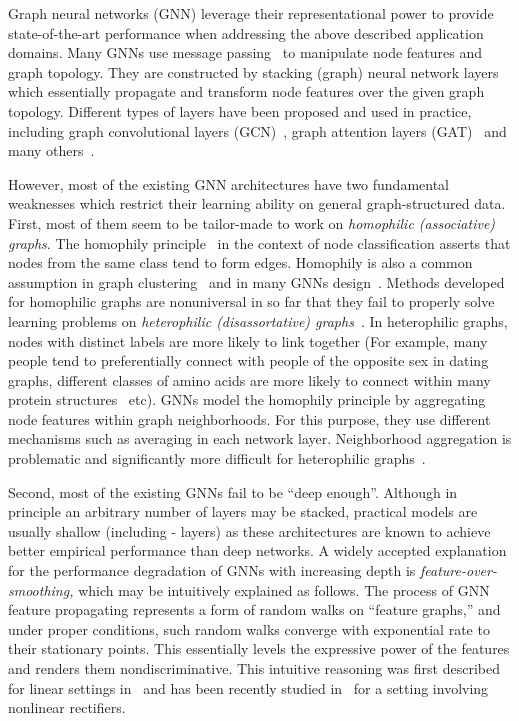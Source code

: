 \documentclass{article} \usepackage{iclr2021_conference,times}
\begin{document}
Graph neural networks (GNN) leverage their representational power to provide state-of-the-art performance when addressing the above described application domains. Many GNNs use message passing~\citep{gilmer2017neural,battaglia2018relational} to manipulate node features and graph topology. They are constructed by stacking (graph) neural network layers which essentially propagate and transform node features over the given graph topology. Different types of layers have been proposed and used in practice, including graph convolutional layers (GCN)~\citep{bruna2014spectral,kipf2017semi}, graph attention layers (GAT)~\citep{velickovic2018graph} and many others~\citep{hamilton2017inductive,wijesinghe2019dfnets,graphsaint-iclr20,abu2019mixhop}.


However, most of the existing GNN architectures have two fundamental weaknesses which restrict their learning ability on general graph-structured data. First, most of them seem to be tailor-made to work on \emph{homophilic (associative) graphs}. The homophily principle~\citep{mcpherson2001birds} in the context of node classification asserts that nodes from the same class tend to form edges. Homophily is also a common assumption in graph clustering~\citep{von2007tutorial,tsourakakis2015provably,dau2017latent} and in many GNNs design~\citep{klicpera2018predict}. Methods developed for homophilic graphs are nonuniversal in so far that they fail to properly solve learning problems on \emph{heterophilic (disassortative) graphs}~\citep{pei2019geom,bojchevski2019pagerank,bojchevski2020scaling}. In heterophilic graphs, nodes with distinct labels are more likely to link together (For example, many people tend to preferentially connect with people of the opposite sex in dating graphs, different classes of amino acids are more likely to connect within many protein structures~\citep{zhu2020generalizing} etc). GNNs model the homophily principle by aggregating node features within graph neighborhoods. For this purpose, they use different mechanisms such as averaging in each network layer. Neighborhood aggregation is problematic and significantly more difficult for heterophilic graphs~\citep{jia2020outcome}.

Second, most of the existing GNNs fail to be ``deep enough''. Although in principle an arbitrary number of layers may be stacked, practical models are usually shallow (including - layers) as these architectures are known to achieve better empirical performance than deep networks. A widely accepted explanation for the performance degradation of GNNs with increasing depth is \emph{feature-over-smoothing,} which may be intuitively explained as follows. The process of GNN feature propagating represents a form of random walks on ``feature graphs,'' and under proper conditions, such random walks converge with exponential rate to their stationary points. This essentially levels the expressive power of the features and renders them nondiscriminative. This intuitive reasoning was first described for linear settings in~\citet{li2018deeper} and has been recently studied in~\citet{oono2019graph} for a setting involving nonlinear rectifiers.
\end{document}
